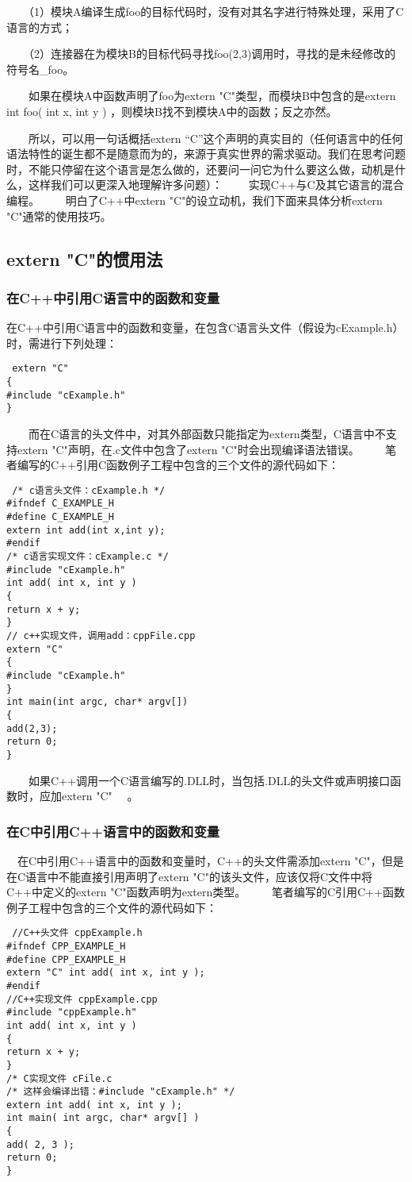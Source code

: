 　　（1）模块A编译生成foo的目标代码时，没有对其名字进行特殊处理，采用了C语言的方式；

　　（2）连接器在为模块B的目标代码寻找foo(2,3)调用时，寻找的是未经修改的符号名\_foo。

　　如果在模块A中函数声明了foo为extern "C"类型，而模块B中包含的是extern int foo( int x, int y ) ，则模块B找不到模块A中的函数；反之亦然。

　　所以，可以用一句话概括extern “C”这个声明的真实目的（任何语言中的任何语法特性的诞生都不是随意而为的，来源于真实世界的需求驱动。我们在思考问题时，不能只停留在这个语言是怎么做的，还要问一问它为什么要这么做，动机是什么，这样我们可以更深入地理解许多问题）：
　　实现C++与C及其它语言的混合编程。
　　明白了C++中extern "C"的设立动机，我们下面来具体分析extern "C"通常的使用技巧。
　　
\subsection{extern "C"的惯用法}
\subsubsection{在C++中引用C语言中的函数和变量}


在C++中引用C语言中的函数和变量，在包含C语言头文件（假设为cExample.h）时，需进行下列处理：
\begin{verbatim}
 extern "C"
{
#include "cExample.h"
}

\end{verbatim} 
　　而在C语言的头文件中，对其外部函数只能指定为extern类型，C语言中不支持extern "C"声明，在.c文件中包含了extern "C"时会出现编译语法错误。
　　笔者编写的C++引用C函数例子工程中包含的三个文件的源代码如下：
\begin{verbatim}
 /* c语言头文件：cExample.h */
#ifndef C_EXAMPLE_H
#define C_EXAMPLE_H
extern int add(int x,int y);
#endif
/* c语言实现文件：cExample.c */
#include "cExample.h"
int add( int x, int y )
{
return x + y;
}
// c++实现文件，调用add：cppFile.cpp
extern "C" 
{
#include "cExample.h"
}
int main(int argc, char* argv[])
{
add(2,3); 
return 0;
}

\end{verbatim} 
　　如果C++调用一个C语言编写的.DLL时，当包括.DLL的头文件或声明接口函数时，应加extern "C" {　}。
\subsubsection{在C中引用C++语言中的函数和变量}
　在C中引用C++语言中的函数和变量时，C++的头文件需添加extern "C"，但是在C语言中不能直接引用声明了extern "C"的该头文件，应该仅将C文件中将C++中定义的extern "C"函数声明为extern类型。
　　笔者编写的C引用C++函数例子工程中包含的三个文件的源代码如下：
\begin{verbatim}
 //C++头文件 cppExample.h
#ifndef CPP_EXAMPLE_H
#define CPP_EXAMPLE_H
extern "C" int add( int x, int y );
#endif
//C++实现文件 cppExample.cpp
#include "cppExample.h"
int add( int x, int y )
{
return x + y;
}
/* C实现文件 cFile.c
/* 这样会编译出错：#include "cExample.h" */
extern int add( int x, int y );
int main( int argc, char* argv[] )
{
add( 2, 3 ); 
return 0;
}
\end{verbatim} 


